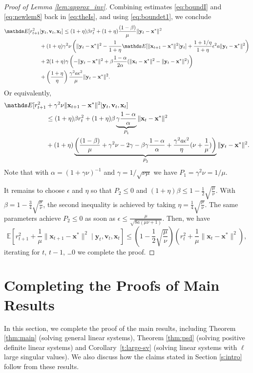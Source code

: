 \documentclass[11pt]{article}
\def\x{{\mathbf x}}
\def\v{{\mathbf v}}
\def\y{{\mathbf y}}
\def\E{{\mathds E}}
\begin{document}
\begin{proof}[Proof of Lemma \ref{lem:approx_inv}]
      Combining estimates \eqref{eq:boundI} and \eqref{eq:newlem8} back in \eqref{eq:theIs}, and using \eqref{eq:boundet1},  we conclude 
      \begin{align}
          \E[r_{t+1}^2 &| \y_t,\v_t,\x_t] \leq (1+\eta)\beta r_t^2 + (1+\eta)\frac{(1-\beta)}{\mu}\|\y_t - \x^*\|^2 \\
          &+ (1+\eta)\gamma^2 \nu\left(\|\y_t -\x^*\|^2 - \frac{1}{1+\eta} \E[\|\x_{t+1} - \x^*\|^2 | \y_t] + \frac{1+1/\eta}{1+\eta}\epsilon^2a\|\y_t-\x^*\|^2 \right) \notag\\
          &+ 2(1+\eta)\gamma \left(-\|\y_t - \x^*\|^2 + \beta\frac{1-\alpha}{2\alpha}(\|\x_t - \x^*\|^2 - \|\y_t-\x^*\|^2) \right)\notag\\
          &+ \left(\frac{1 + \eta}{\eta}\right)\frac{\gamma^2 a \epsilon^2}{\mu}\|\y_t-\x^*\|^2.\notag
      \end{align}
Or equivalently,
\begin{align}
    \E[r_{t+1}^2 &+ \gamma^2\nu\|\x_{t+1}-\x^*\|^2 | \y_t,\v_t,\x_t] \notag\\
    &\leq (1+\eta)\beta r_t^2 + (1+\eta)\beta\underbrace{\gamma\frac{1-\alpha}{\alpha}}_{P_1}\|\x_t-\x^*\|^2 \\
     &+ (1+\eta)\underbrace{\left(\frac{(1-\beta)}{\mu} +\gamma^2\nu - 2\gamma -\beta\gamma\frac{1-\alpha}{\alpha} + \frac{\gamma^2 a \epsilon^2}{\eta}(\nu   + \frac{1}{\mu})  \right)}_{P_2}\|\y_t - \x^*\|^2.\notag
\end{align}
Note that with $\alpha = (1 + \gamma \nu)^{-1}$ and $\gamma = 1/\sqrt{\nu \mu}$ we have $P_1 = \gamma^2\nu=1/\mu$. 

It remains to choose $\epsilon$ and $\eta$ so that $P_2 \leq 0$ and $(1+\eta)\beta \leq 1- \frac{1}{2}\sqrt{\frac{\mu}{\nu}}$. With $\beta = 1 - \frac{3}{4}\sqrt{\frac\mu\nu}$, the second inequality is achieved by taking $\eta=\frac14\sqrt{\frac\mu\nu}$.
The same parameters achieve $P_2 \le 0$ as soon as $\epsilon \le \frac{\mu}{\sqrt{8a(\mu \nu + 1)}}.$
Then, we have
$$
\E\left[r_{t+1}^2 + \frac1{\mu}\|\x_{t+1}-\x^*\|^2 \;|\; \y_t,\v_t,\x_t\right] \leq \left(1-\frac{1}{2}\sqrt{\frac{\mu}{\nu}}\right)\left(r_t^2 + \frac1{\mu}\|\x_{t}-\x^*\|^2\right),
$$
iterating for $t$, $t-1$, \ldots $0$ we complete the proof.
\end{proof}

\section{Completing the Proofs of Main Results}
\label{s:completing}
In this section, we complete the proof of the main results, including Theorem \ref{thm:main} (solving general linear systems), Theorem \ref{thm:psd} (solving positive definite linear systems) and Corollary~\ref{t:large-sv} (solving linear systems with $\ell$ large singular values). We also discuss how the claims stated in Section \ref{s:intro} follow from these results.
\end{document}
